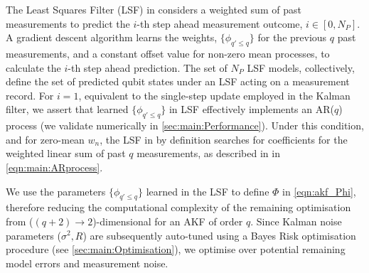 The Least Squares Filter (LSF) in \cite{mavadia2017} considers a weighted sum of past measurements to predict the $i$-th step ahead measurement outcome, $i \in [0, N_P]$. A gradient descent algorithm learns the weights, $\{\phi_{q' \leq q}\}$ for the previous $q$ past measurements, and a constant offset value for non-zero mean processes, to calculate the $i$-th step ahead prediction. The set of $N_P$ LSF models, collectively, define the set of predicted qubit states under an LSF acting on a measurement record.  For $i=1$, equivalent to the single-step update employed in the Kalman filter, we assert that learned $\{\phi_{q' \leq q}\}$ in LSF effectively implements an AR($q$) process (we validate numerically in \cref{sec:main:Performance}). Under this condition, and for zero-mean $w_n$, the LSF in \cite{mavadia2017} by definition searches for coefficients for the weighted linear sum of past $q$ measurements, as described in in \cref{eqn:main:ARprocess}. 

We use the parameters $\{\phi_{q' \leq q}\}$ learned in the LSF to define $\Phi$ in \cref{eqn:akf_Phi}, therefore reducing the computational complexity of the remaining optimisation from ($(q+2)\to 2$)-dimensional for an AKF of order $q$. Since Kalman noise parameters ($\sigma^2, R$) are subsequently auto-tuned using a Bayes Risk optimisation procedure (see \cref{sec:main:Optimisation}), we optimise over potential remaining model errors and measurement noise.  


